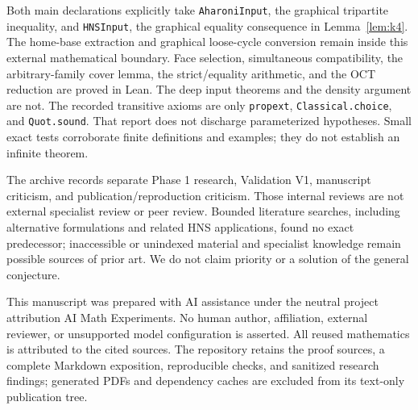 \documentclass[11pt]{article}
\begin{document}
Both main declarations explicitly take \texttt{AharoniInput}, the
graphical tripartite inequality, and \texttt{HNSInput}, the graphical
equality consequence in Lemma~\ref{lem:k4}. The home-base extraction and
graphical loose-cycle conversion remain inside this external mathematical
boundary. Face selection, simultaneous compatibility, the arbitrary-family
cover lemma, the strict/equality arithmetic, and the OCT reduction are
proved in Lean. The deep input theorems and the density argument are not.
The recorded transitive axioms are only \texttt{propext},
\texttt{Classical.choice}, and \texttt{Quot.sound}. That report does not
discharge parameterized hypotheses. Small exact tests corroborate finite
definitions and examples; they do not establish an infinite theorem.

The archive records separate Phase 1 research, Validation V1, manuscript
criticism, and publication/reproduction criticism. Those internal reviews
are not external specialist review or peer review. Bounded literature
searches, including alternative formulations and related HNS applications,
found no exact predecessor; inaccessible or unindexed material and
specialist knowledge remain possible sources of prior art. We do not
claim priority or a solution of the general conjecture.

This manuscript was prepared with AI assistance under the neutral project
attribution AI Math Experiments. No human author, affiliation, external
reviewer, or unsupported model configuration is asserted. All reused
mathematics is attributed to the cited sources. The repository retains
the proof sources, a complete Markdown exposition, reproducible checks,
and sanitized research findings; generated PDFs and dependency caches
are excluded from its text-only publication tree.



\end{document}
